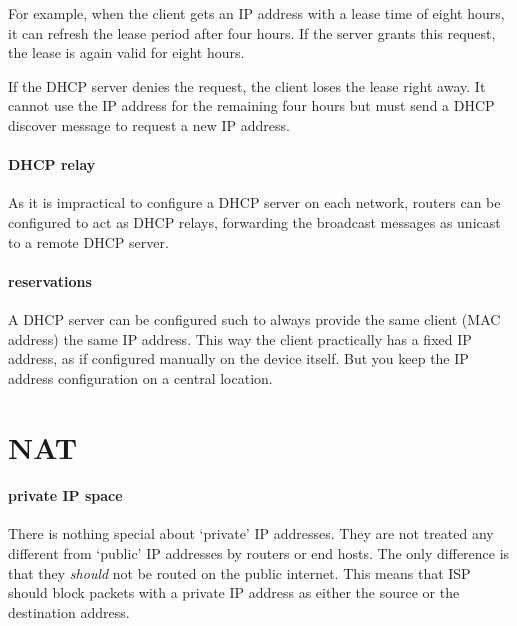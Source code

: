 For example, when the client gets an \acs{IP} address with a lease time of eight hours, it can refresh the lease period after four hours.
If the server grants this request, the lease is again valid for eight hours.

If the \acs{DHCP} server denies the request, the client loses the lease right away.
It cannot use the \acs{IP} address for the remaining four hours but must send a \acs{DHCP} discover message to request a new \acs{IP} address.

\paragraph{\acs{DHCP} relay}
As it is impractical to configure a \acs{DHCP} server on each network, routers can be configured to act as \acs{DHCP} relays, forwarding the broadcast messages%
as unicast to a remote \acs{DHCP} server.

\paragraph{reservations}
A \acs{DHCP} server can be configured such to always provide the same client (\acs{MAC} address) the same \acs{IP} address.
This way the client practically has a fixed \acs{IP} address, as if configured manually on the device itself.
But you keep the \acs{IP} address configuration on a central location.




\section{\Acl{NAT}}
\label{sec:ip-nat}


\paragraph{private \acs{IP} space}
There is nothing special about `private' \acs{IP} addresses.
They are not treated any different from `public' \acs{IP} addresses by routers or end hosts.
The only difference is that they \emph{should} not be routed on the public internet.
This means that \acl{ISP} should block packets with a private \acs{IP} address as either the source or the destination address.

